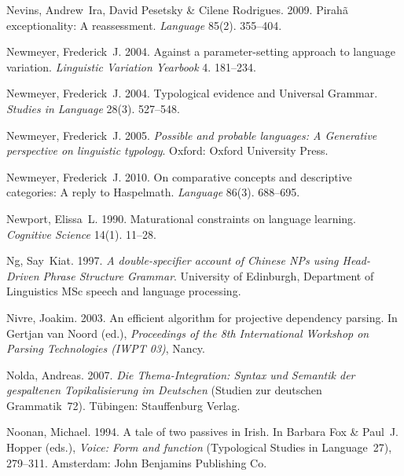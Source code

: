 \begin{thebibliography}{1420}
Nevins, Andrew~Ira, David Pesetsky \& Cilene Rodrigues. 2009.
\newblock Pirah{\~a} exceptionality: {A} reassessment.
\newblock \emph{Language} 85(2). 355--404.

Newmeyer, Frederick~J. 2004{}.
\newblock Against a parameter-setting approach to language variation.
\newblock \emph{Linguistic Variation Yearbook} 4. 181--234.

Newmeyer, Frederick~J. 2004{}.
\newblock Typological evidence and {Universal Grammar}.
\newblock \emph{Studies in Language} 28(3). 527--548.

Newmeyer, Frederick~J. 2005.
\newblock \emph{Possible and probable languages: {A} {Generative} perspective
  on linguistic typology}.
\newblock Oxford: Oxford University Press.

Newmeyer, Frederick~J. 2010.
\newblock On comparative concepts and descriptive categories: {A} reply to
  {Haspelmath}.
\newblock \emph{Language} 86(3). 688--695.

Newport, Elissa~L. 1990.
\newblock Maturational constraints on language learning.
\newblock \emph{Cognitive Science} 14(1). 11--28.

Ng, Say~Kiat. 1997.
\newblock \emph{A double-specifier account of {Chinese} {NPs} using
  {Head-Driven Phrase Structure Grammar}}.
\newblock University of Edinburgh, Department of Linguistics {MSc} speech and
  language processing.

Nivre, Joakim. 2003.
\newblock An efficient algorithm for projective dependency parsing.
\newblock In Gertjan van Noord (ed.), \emph{Proceedings of the {8th
  International Workshop on Parsing Technologies (IWPT 03)}}, Nancy.

Nolda, Andreas. 2007.
\newblock \emph{{Die Thema-Integration: Syntax und Semantik der gespaltenen
  Topikalisierung im Deutschen}} (Studien zur deutschen Grammatik~72).
\newblock T{\"u}bingen: Stauffenburg Verlag.

Noonan, Michael. 1994.
\newblock A tale of two passives in {Irish}.
\newblock In Barbara Fox \& Paul~J. Hopper (eds.), \emph{Voice: Form and
  function} (Typological Studies in Language~27), 279--311. Amsterdam: John
  Benjamins Publishing Co.


\end{thebibliography}
